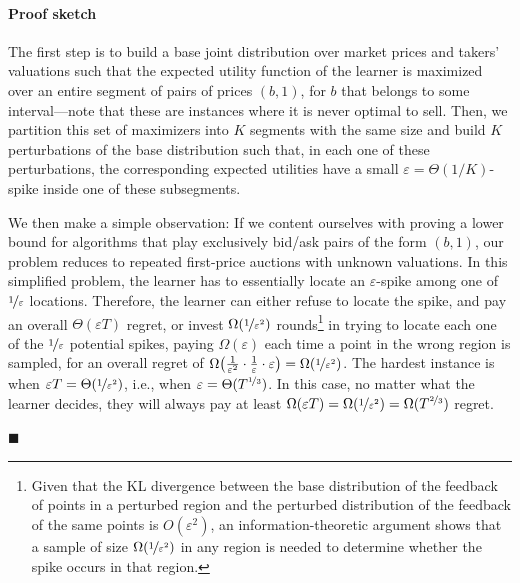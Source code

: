 \documentclass[final,12pt]{colt2025}
\newenvironment{proofsketch}{\paragraph{Proof sketch}}{\hfill$\blacksquare$}
\newcommand{\e}{\varepsilon}
\newcommand{\brb}[1]{\bigl(#1\bigr)}
\newcommand{\bsb}[1]{\bigl[#1\bigr]}
\newcommand{\nb}{b}
\begin{document}
\begin{proofsketch}%
The first step is to build a base joint distribution over market prices and takers' valuations such that the expected utility function of the learner is maximized over an entire segment of pairs of prices $(\nb,1)$, for $\nb$ that belongs to some interval---note that these are instances where it is never optimal to sell.
Then, we partition this set of maximizers into $K $ %
segments with the same size and build $K$ perturbations of the base distribution such that, in each one of these perturbations, the corresponding expected utilities have a small $\e = \Theta ( 1/K )$-spike inside one of these subsegments.

We then make a simple observation:
If we content ourselves with proving a lower bound for algorithms that play exclusively bid/ask pairs of the form $(\nb, 1)$, our problem reduces to repeated first-price auctions with unknown valuations. 
In this simplified problem, the learner has to essentially locate an $\e$-spike among one of $\nicefrac{1}{\e}$ locations. 
Therefore, the learner can either refuse to locate the spike, and pay an overall $\Theta (\e T)$ regret, or invest $\Omega (\nicefrac{1}{\e^2})$ rounds\footnote{Given that the KL divergence between the base distribution of the feedback of points in a perturbed region and the perturbed distribution of the feedback of the same points is $O(\e^2)$, an information-theoretic argument shows that a sample of size $\Omega(\nicefrac{1}{\e^2})$ in any region is needed to determine whether the spike occurs in that region.} in trying to locate each one of the $\nicefrac{1}{\e}$ potential spikes, paying $\Omega (\e)$ each time a point in the wrong region is sampled, for an overall regret of $\Omega \brb{ \frac{1}{\e^2} \cdot \frac{1}{\e} \cdot \e } = \Omega ( \nicefrac{1}{\e^2} )$. 
The hardest instance is when $\e T = \Theta ( \nicefrac{1}{\e^2} )$, i.e., when $\e = \Theta ( T^{\nicefrac{1}{3}} )$.
In this case, no matter what the learner decides, they will always pay at least $\Omega ( \e T ) = \Omega( \nicefrac{1}{\e^2} ) = \Omega (T^{\nicefrac{2}{3}} )$ regret.


\end{proofsketch}
\end{document}
